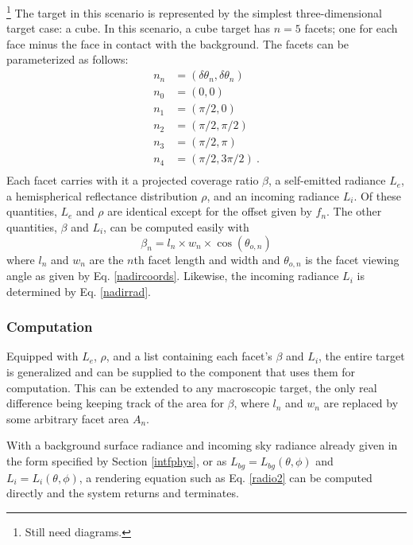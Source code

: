 \documentclass{article}
\numberwithin{equation}{section}
\begin{document}
            \footnote{Still need diagrams.}
            The target in this scenario is represented by the simplest three-dimensional target case: a cube.
            In this scenario, a cube target has $n=5$ facets; one for each face minus the face in contact with the
            background.
            The facets can be parameterized as follows:
            \begin{align*}
                n_n &= (\delta\theta_n,\delta\theta_n)\\
                n_0 &= (0,0)\\
                n_1 &= (\pi/2,0)\\
                n_2 &= (\pi/2,\pi/2)\\
                n_3 &= (\pi/2,\pi)\\
                n_4 &= (\pi/2,3\pi/2)\ .\\
            \end{align*}
            Each facet carries with it a projected coverage ratio $\beta$, a self-emitted radiance $L_e$, a 
            hemispherical reflectance distribution $\rho$, and an incoming radiance $L_i$.
            Of these quantities, $L_e$ and $\rho$ are identical except for the offset given by $f_n$.
            The other quantities, $\beta$ and $L_i$, can be computed easily with
            $$\beta_n = l_n \times w_n \times \cos(\theta_{o,n})$$
            where $l_n$ and $w_n$ are the $n$th facet length and width and $\theta_{o,n}$ is the facet viewing
            angle as given by Eq. \ref{nadircoords}.
            Likewise, the incoming radiance $L_i$ is determined by Eq. \ref{nadirrad}.

        \subsubsection*{Computation}
                
            Equipped with $L_e$, $\rho$, and a list containing each facet's $\beta$ and $L_i$, the entire target
            is generalized and can be supplied to the component that uses them for computation.
            This can be extended to any macroscopic target, the only real difference being keeping track of the 
            area for $\beta$, where $l_n$ and $w_n$ are replaced by some arbitrary facet area $A_n$.

            With a background surface radiance and incoming sky radiance already given in the form specified by 
            Section \ref{intfphys}, or as $L_{bg} = L_{bg}(\theta,\phi)$ and $L_i = L_i(\theta,\phi)$, a rendering
            equation such as Eq. \ref{radio2} can be computed directly and the system returns and terminates.
\end{document}
